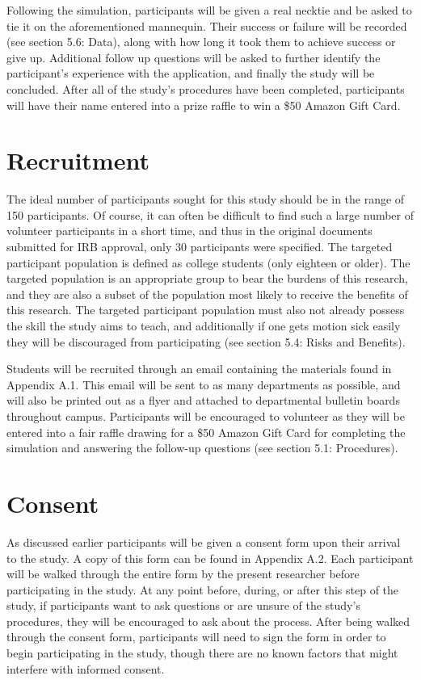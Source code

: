 Following the simulation, participants will be given a real necktie and be asked to tie it on the aforementioned mannequin. Their success or failure will be recorded (see section 5.6: Data), along with how long it took them to achieve success or give up. Additional follow up questions will be asked to further identify the participant's experience with the application, and finally the study will be concluded. After all of the study's procedures have been completed, participants will have their name entered into a prize raffle to win a \$50 Amazon Gift Card.

\section{Recruitment}
\label{sec:recruit}

The ideal number of participants sought for this study should be in the range of 150 participants. Of course, it can often be difficult to find such a large number of volunteer participants in a short time, and thus in the original documents submitted for IRB approval, only 30 participants were specified. The targeted participant population is defined as college students (only eighteen or older). The targeted population is an appropriate group to bear the burdens of this research, and they are also a subset of the population most likely to receive the benefits of this research. The targeted participant population must also not already possess the skill the study aims to teach, and additionally if one gets motion sick easily they will be discouraged from participating (see section 5.4: Risks and Benefits). 

Students will be recruited through an email containing the materials found in Appendix A.1. This email will be sent to as many departments as possible, and will also be printed out as a flyer and attached to departmental bulletin boards throughout campus. Participants will be encouraged to volunteer as they will be entered into a fair raffle drawing for a \$50 Amazon Gift Card for completing the simulation and answering the follow-up questions (see section 5.1: Procedures).

\section{Consent}
\label{sec:consent}

As discussed earlier participants will be given a consent form upon their arrival to the study. A copy of this form can be found in Appendix A.2. Each participant will be walked through the entire form by the present researcher before participating in the study. At any point before, during, or after this step of the study, if participants want to ask questions or are unsure of the study's procedures, they will be encouraged to ask about the process. After being walked through the consent form, participants will need to sign the form in order to begin participating in the study, though there are no known factors that might interfere with informed consent.

